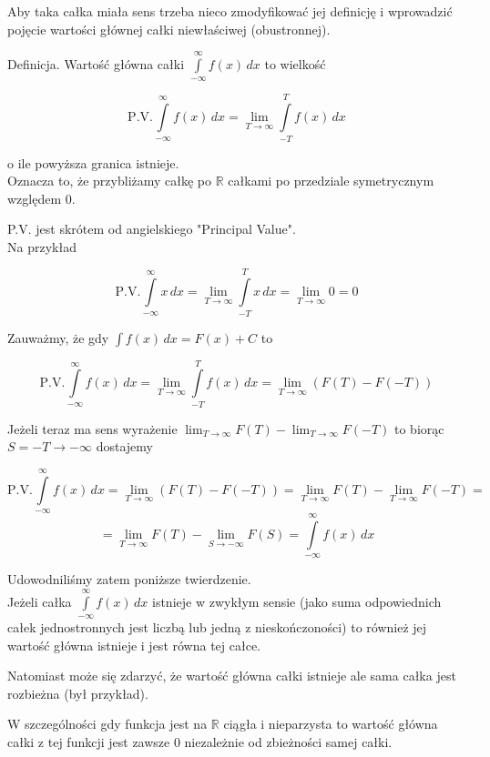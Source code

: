 Aby taka całka miała sens trzeba nieco zmodyfikować jej definicję i wprowadzić pojęcie wartości głównej całki niewłaściwej (obustronnej).

Definicja. Wartość główna całki $ \int\limits_{-\infty}^{\infty} f(x) \,dx $ to wielkość

$$ \textrm{P.V.} \int\limits_{-\infty}^{\infty} f(x) \,dx = \lim_{T \to \infty} \int\limits_{-T}^{T} f(x) \,dx $$

o ile powyższa granica istnieje. \\

Oznacza to, że przybliżamy całkę po $\mathbb{R}$ całkami po przedziale symetrycznym względem 0.

P.V. jest skrótem od angielskiego "Principal Value". \\

Na przykład 

$$ \textrm{P.V.} \int\limits_{-\infty}^{\infty} x \,dx = \lim_{T \to \infty} \int\limits_{-T}^{T} x\,dx
= \lim_{T \to \infty} 0 = 0 $$

Zauważmy, że gdy $ \int f(x) \,dx = F(x) + C $ to

$$ \textrm{P.V.} \int\limits_{-\infty}^{\infty} f(x) \,dx = \lim_{T \to \infty} \int\limits_{-T}^{T} f(x) \,dx
= \lim_{T \to \infty} (F(T) - F(-T)) $$

Jeżeli teraz ma sens wyrażenie $ \lim_{T \to \infty} F(T ) - \lim_{T \to \infty} F(-T) $ to biorąc $ S = -T \to -\infty $ dostajemy

$$ \textrm{P.V.} \int\limits_{-\infty}^{\infty} f(x) \,dx = \lim_{T \to \infty} (F(T) - F(-T)) = 
\lim_{T \to \infty} F(T) - \lim_{T \to \infty} F(-T) = $$ $$ =  \lim_{T \to \infty} F(T) - \lim_{S \to -\infty} F(S)
= \int\limits_{-\infty}^{\infty} f(x) \,dx $$

Udowodniliśmy zatem poniższe twierdzenie. \\

Jeżeli całka $ \int\limits_{-\infty}^{\infty} f(x) \,dx $ istnieje w zwykłym sensie (jako suma odpowiednich całek jednostronnych
jest liczbą lub jedną z nieskończoności) to również jej wartość główna istnieje i jest równa tej całce.

Natomiast może się zdarzyć, że wartość główna całki istnieje ale sama całka jest rozbieżna (był przykład).

W szczególności gdy funkcja jest na $\mathbb{R}$ ciągła i nieparzysta to wartość główna całki z tej funkcji jest zawsze
0 niezależnie od zbieżności samej całki.